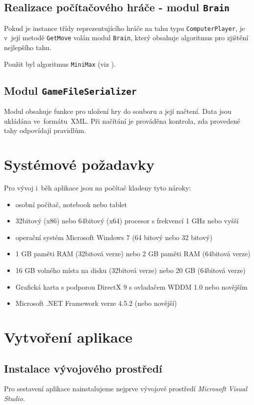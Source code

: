 \documentclass[12pt]{article}
\begin{document}
\subsection{Realizace počítačového hráče - modul \texttt{Brain}}
Pokud je instance třídy reprezentujícího hráče na tahu typu \texttt{ComputerPlayer}, je v~její metodě \texttt{GetMove} volán modul \texttt{Brain}, který obsahuje algoritmus pro zjištění nejlepšího tahu.

Použit byl algoritmus \texttt{MiniMax} (viz \cite{kuhr2011}).

\subsection{Modul \texttt{GameFileSerializer}}
Modul obsahuje funkce pro uložení hry do souboru a její načtení. Data jsou ukládána ve~formátu~XML. Při načítání je prováděna kontrola, zda provedené tahy odpovídají pravidlům.

\section{Systémové požadavky}
Pro vývoj i~běh aplikace jsou na počítač kladeny tyto nároky:
	\begin{itemize}  
		\item osobní počítač, notebook nebo tablet
		\item 32bitový (x86) nebo 64bitový (x64) procesor s frekvencí 1 GHz nebo vyšší
		\item operační systém Microsoft Windows 7 (64 bitový nebo 32 bitový)
		\item 1 GB paměti RAM (32bitová verze) nebo 2 GB paměti RAM (64bitová verze)
		\item 16 GB volného místa na disku (32bitová verze) nebo 20 GB (64bitová verze)
		\item Grafická karta s podporou DirectX 9 s ovladačem WDDM 1.0 nebo novějším
		\item Microsoft .NET Framework verze 4.5.2 (nebo novější)
	\end{itemize}

\section{Vytvoření aplikace}
\subsection{Instalace vývojového prostředí}
Pro sestavení aplikace nainstalujeme nejprve vývojové prostředí \emph{Microsoft Visual Studio}.
\end{document}
